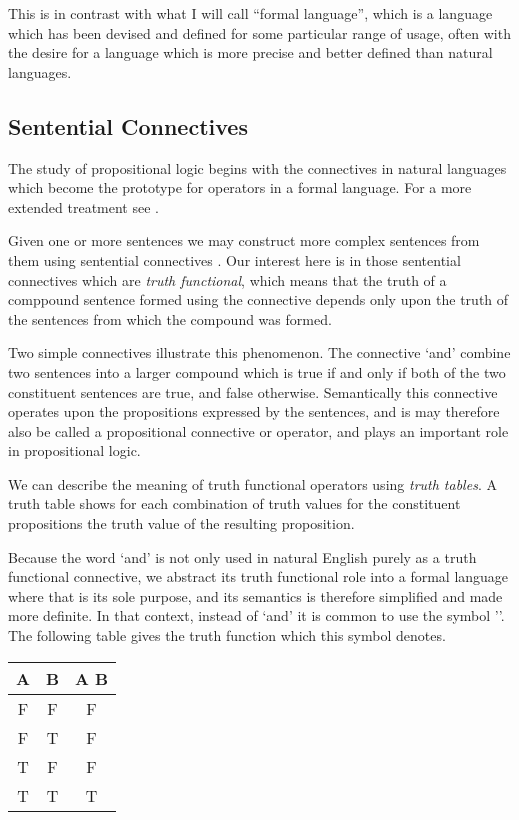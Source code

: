 \documentclass[10pt,titlepage]{article}
\begin{document}
This is in contrast with what I will call ``formal language'', which is a language which has been devised and defined for some particular range of usage, often with the desire for a language which is more precise and better defined than natural languages.

\subsection{Sentential Connectives}

The study of propositional logic begins with the connectives in natural languages which become the prototype for operators in a formal language.
For a more extended treatment see \cite{sep-connectives-logic}.

Given one or more sentences we may construct more complex sentences from them using sentential connectives .
Our interest here is in those sentential connectives which are \emph{truth functional}, which means that the truth of a comppound sentence formed using the connective depends only upon the truth of the sentences from which the compound was formed.

Two simple connectives illustrate this phenomenon.
The connective `and' combine two sentences into a larger compound which is true if and only if both of the two constituent sentences are true, and false otherwise.
Semantically this connective operates upon the propositions expressed by the sentences, and is may therefore also be called a propositional connective or operator, and plays an important role in propositional logic.

We can describe the meaning of truth functional operators using \emph{truth tables}.
A truth table shows for each combination of truth values for the constituent propositions the truth value of the resulting proposition.

Because the word `and' is not only used in natural English purely as a truth functional connective, we abstract its truth functional role into a formal language where that is its sole purpose, and its semantics is therefore simplified and made more definite.
In that context, instead of `and' it is common to use the symbol '\land'.
The following table gives the truth function which this symbol denotes.

\begin{center}
  \begin{tabular}{c|c|c}
 A & B & A \land{} B\\
 \hline
 F & F & F\\
 F & T & F\\
 T & F & F\\
 T & T & T\\
 \end{tabular}
\end{center}
\end{document}
